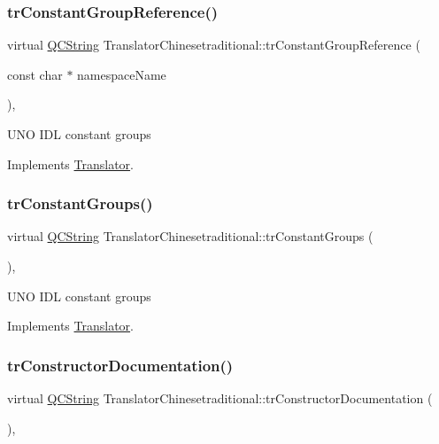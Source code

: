 \subsubsection{\texorpdfstring{trConstantGroupReference()}{trConstantGroupReference()}}
{\footnotesize\ttfamily virtual \mbox{\hyperlink{class_q_c_string}{Q\+C\+String}} Translator\+Chinesetraditional\+::tr\+Constant\+Group\+Reference (\begin{DoxyParamCaption}\item[{const char $\ast$}]{namespace\+Name }\end{DoxyParamCaption})\hspace{0.3cm}{\ttfamily [inline]}, {\ttfamily [virtual]}}

U\+NO I\+DL constant groups 

Implements \mbox{\hyperlink{class_translator}{Translator}}.

\mbox{\label{class_translator_chinesetraditional_a476250d59fc7c2599b65b052287b3505}} 
\subsubsection{\texorpdfstring{trConstantGroups()}{trConstantGroups()}}
{\footnotesize\ttfamily virtual \mbox{\hyperlink{class_q_c_string}{Q\+C\+String}} Translator\+Chinesetraditional\+::tr\+Constant\+Groups (\begin{DoxyParamCaption}{ }\end{DoxyParamCaption})\hspace{0.3cm}{\ttfamily [inline]}, {\ttfamily [virtual]}}

U\+NO I\+DL constant groups 

Implements \mbox{\hyperlink{class_translator}{Translator}}.

\mbox{\label{class_translator_chinesetraditional_a2ceebe1beb156a83ed38af7690b732f4}} 
\subsubsection{\texorpdfstring{trConstructorDocumentation()}{trConstructorDocumentation()}}
{\footnotesize\ttfamily virtual \mbox{\hyperlink{class_q_c_string}{Q\+C\+String}} Translator\+Chinesetraditional\+::tr\+Constructor\+Documentation (\begin{DoxyParamCaption}{ }\end{DoxyParamCaption})\hspace{0.3cm}{\ttfamily [inline]}, {\ttfamily [virtual]}}

